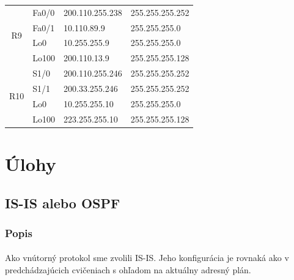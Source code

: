 \documentclass[12pt,twoside,a4paper]{report}
\begin{document}
\begin{table}[!htbp]
\begin{tabular}{|c|l|l|l|}
\multirow{4}{*}{R9}  & Fa0/0                                   & 200.110.255.238                         & 255.255.255.252                     \\ \cline{2-4} 
                     & Fa0/1                                   & 10.110.89.9                             & 255.255.255.0                       \\ \cline{2-4} 
                     & Lo0                                     & 10.255.255.9                            & 255.255.255.0                       \\ \cline{2-4} 
                     & Lo100                                   & 200.110.13.9                            & 255.255.255.128                     \\ \hline
\multirow{4}{*}{R10} & S1/0                                    & 200.110.255.246                         & 255.255.255.252                     \\ \cline{2-4} 
                     & S1/1                                    & 200.33.255.246                          & 255.255.255.252                     \\ \cline{2-4} 
                     & Lo0                                     & 10.255.255.10                           & 255.255.255.0                       \\ \cline{2-4} 
                     & Lo100                                   & 223.255.255.10                          & 255.255.255.128                     \\ \hline
\end{tabular}
\end{table}


\clearpage

\section{Úlohy}
\subsection{IS-IS alebo OSPF}
\subsubsection{Popis}
\paragraph{}
Ako vnútorný protokol sme zvolili IS-IS. Jeho konfigurácia je rovnaká ako v predchádzajúcich cvičeniach s ohľadom na aktuálny adresný plán.
\end{document}
